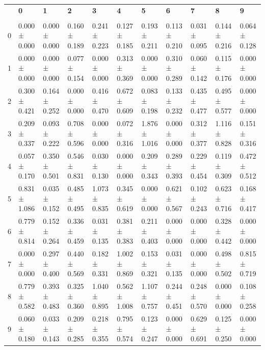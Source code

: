 \begingroup
\scriptsize
\setlength{\tabcolsep}{3pt}
\begin{tabular}{lllllllllll}
\toprule
 & \textbf{0} & \textbf{1} & \textbf{2} & \textbf{3} & \textbf{4} & \textbf{5} & \textbf{6} & \textbf{7} & \textbf{8} & \textbf{9} \\
  &  &  &  &  &  &  &  &  &  &  \\
\midrule
0 & 0.000 ± 0.000 & 0.000 ± 0.000 & 0.160 ± 0.189 & 0.241 ± 0.223 & 0.127 ± 0.185 & 0.193 ± 0.211 & 0.113 ± 0.210 & 0.031 ± 0.095 & 0.144 ± 0.216 & 0.064 ± 0.128 \\
1 & 0.000 ± 0.000 & 0.000 ± 0.000 & 0.077 ± 0.154 & 0.000 ± 0.000 & 0.313 ± 0.369 & 0.000 ± 0.000 & 0.310 ± 0.289 & 0.060 ± 0.142 & 0.115 ± 0.176 & 0.000 ± 0.000 \\
2 & 0.300 ± 0.421 & 0.164 ± 0.252 & 0.000 ± 0.000 & 0.416 ± 0.470 & 0.672 ± 0.609 & 0.083 ± 0.198 & 0.133 ± 0.232 & 0.435 ± 0.477 & 0.495 ± 0.577 & 0.000 ± 0.000 \\
3 & 0.209 ± 0.337 & 0.093 ± 0.222 & 0.708 ± 0.596 & 0.000 ± 0.000 & 0.072 ± 0.316 & 1.876 ± 1.016 & 0.000 ± 0.000 & 0.312 ± 0.377 & 1.116 ± 0.828 & 0.151 ± 0.316 \\
4 & 0.057 ± 0.170 & 0.350 ± 0.501 & 0.546 ± 0.831 & 0.030 ± 0.130 & 0.000 ± 0.000 & 0.209 ± 0.343 & 0.289 ± 0.393 & 0.229 ± 0.454 & 0.119 ± 0.309 & 0.472 ± 0.512 \\
5 & 0.831 ± 1.086 & 0.035 ± 0.152 & 0.485 ± 0.495 & 1.073 ± 0.835 & 0.345 ± 0.619 & 0.000 ± 0.000 & 0.621 ± 0.567 & 0.102 ± 0.243 & 0.623 ± 0.716 & 0.168 ± 0.417 \\
6 & 0.779 ± 0.814 & 0.152 ± 0.264 & 0.336 ± 0.459 & 0.031 ± 0.135 & 0.381 ± 0.383 & 0.211 ± 0.403 & 0.000 ± 0.000 & 0.000 ± 0.000 & 0.328 ± 0.442 & 0.000 ± 0.000 \\
7 & 0.000 ± 0.000 & 0.297 ± 0.400 & 0.440 ± 0.569 & 0.182 ± 0.331 & 1.002 ± 0.869 & 0.153 ± 0.321 & 0.031 ± 0.135 & 0.000 ± 0.000 & 0.498 ± 0.502 & 0.815 ± 0.719 \\
8 & 0.779 ± 0.582 & 0.393 ± 0.483 & 0.325 ± 0.360 & 1.040 ± 0.895 & 0.562 ± 1.008 & 1.107 ± 0.757 & 0.244 ± 0.451 & 0.248 ± 0.570 & 0.000 ± 0.000 & 0.108 ± 0.258 \\
9 & 0.060 ± 0.180 & 0.033 ± 0.143 & 0.209 ± 0.285 & 0.218 ± 0.355 & 0.795 ± 0.574 & 0.123 ± 0.247 & 0.000 ± 0.000 & 0.629 ± 0.691 & 0.125 ± 0.250 & 0.000 ± 0.000 \\
\bottomrule
\end{tabular}

\endgroup
